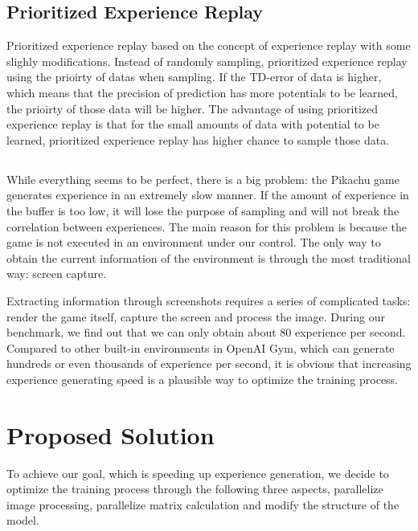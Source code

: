\documentclass[sigconf]{acmart}
\begin{document}
\subsection{Prioritized Experience Replay}
Prioritized experience replay based on the concept of experience replay with some slighly modifications. Instead of randomly sampling, prioritized experience replay using the prioirty of datas when sampling. If the TD-error of data is higher, which means that the precision of prediction has more potentials to be learned, the prioirty of those data will be higher. The advantage of using prioritized experience replay is that for the small amounts of data with potential to be learned, prioritized experience replay has higher chance to sample those data.


\subsection*{}
While everything seems to be perfect, there is a big problem: the Pikachu game generates experience in an extremely slow manner. If the amount of experience in the buffer is too low, it will lose the purpose of sampling and will not break the correlation between experiences. The main reason for this problem is because the game is not executed in an environment under our control. The only way to obtain the current information of the environment is through the most traditional way: screen capture.

Extracting information through screenshots requires a series of complicated tasks: render the game itself, capture the screen and process the image. During our benchmark, we find out that we can only obtain about 80 experience per second. Compared to other built-in environments in OpenAI Gym, which can generate hundreds or even thousands of experience per second, it is obvious that increasing experience generating speed is a plausible way to optimize the training process.

\section{Proposed Solution}
To achieve our goal, which is speeding up experience generation, we decide to optimize the training process through the following three aspects, parallelize image processing, parallelize matrix calculation and modify the structure of the model.
\end{document}
